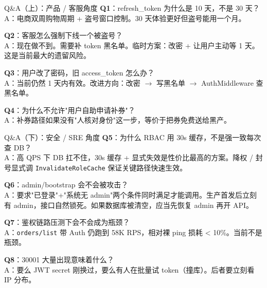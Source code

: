 \appendix

\begin{frame}{Q\&A（上）：产品 / 客服角度}
\textbf{Q1}：refresh\_token 为什么是 10 天，不是 30 天？\\
\hspace{4mm}\small A：电商双周购物周期 + 盗号窗口控制。30 天体验更好但盗号能用一个月。

\vspace{2mm}
\textbf{Q2}：客服怎么强制下线一个被盗号？\\
\hspace{4mm}\small A：现在做不到。需要补 token 黑名单。临时方案：改密 + 让用户主动等 1 天。这是当前最大的遗留风险。

\vspace{2mm}
\textbf{Q3}：用户改了密码，旧 access\_token 怎么办？\\
\hspace{4mm}\small A：当前仍然 1 天内有效。改进方向：改密 $\to$ 写黑名单 $\to$ AuthMiddleware 查黑名单。

\vspace{2mm}
\textbf{Q4}：为什么不允许"用户自助申请补券"？\\
\hspace{4mm}\small A：补券路径如果没有"人核对身份"这一步，等价于把券免费送给黑产。
\end{frame}

\begin{frame}{Q\&A（下）：安全 / SRE 角度}
\textbf{Q5}：为什么 RBAC 用 30s 缓存，不是强一致每次查 DB？\\
\hspace{4mm}\small A：高 QPS 下 DB 扛不住，30s 缓存 + 显式失效是性价比最高的方案。降权 / 封号显式调 \texttt{InvalidateRoleCache} 保证关键路径快速生效。

\vspace{2mm}
\textbf{Q6}：admin/bootstrap 会不会被攻击？\\
\hspace{4mm}\small A：要求"已登录"+"系统无 admin"两个条件同时满足才能调用。生产首发后立刻有 admin，接口自然锁死。如果数据库被清空，应当先恢复 admin 再开 API。

\vspace{2mm}
\textbf{Q7}：鉴权链路压测下会不会成为瓶颈？\\
\hspace{4mm}\small A：\texttt{orders/list} 带 Auth 仍跑到 58K RPS，相对裸 ping 损耗 < 10\%。当前不是瓶颈。

\vspace{2mm}
\textbf{Q8}：30001 大量出现意味着什么？\\
\hspace{4mm}\small A：要么 JWT secret 刚换过，要么有人在批量试 token（撞库）。后者要立刻看 IP 分布。
\end{frame}


